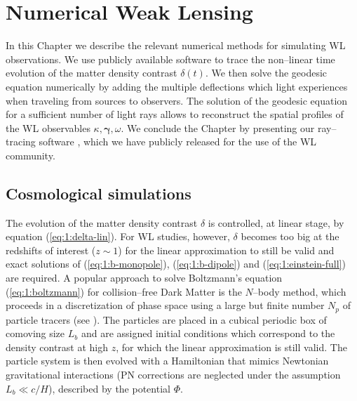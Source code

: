 
\chapter{Numerical Weak Lensing}
 \thispagestyle{plain}
\setlength{\parindent}{10mm}

\label{chp:3}
In this Chapter we describe the relevant numerical methods for simulating WL observations. We use publicly available software to trace the non--linear time evolution of the matter density contrast $\delta(t)$. We then solve the geodesic equation numerically by adding the multiple deflections which light experiences when traveling from sources to observers. The solution of the geodesic equation for a sufficient number of light rays allows to reconstruct the spatial profiles of the WL observables $\kappa,\pmb{\gamma},\omega$. We conclude the Chapter by presenting our ray--tracing software \LT, which we have publicly released for the use of the WL community.


\section{Cosmological simulations}
The evolution of the matter density contrast $\delta$ is controlled, at linear stage, by equation (\ref{eq:1:delta-lin}). For WL studies, however, $\delta$ becomes too big at the redshifts of interest ($z\sim 1$) for the linear approximation to still be valid and exact solutions of (\ref{eq:1:b-monopole}), (\ref{eq:1:b-dipole}) and (\ref{eq:1:einstein-full}) are required. A popular approach to solve Boltzmann's equation (\ref{eq:1:boltzmann}) for collision--free Dark Matter is the $N$--body method, which proceeds in a discretization of phase space using a large but finite number $N_p$ of particle tracers (see \citep{gadget2}). The particles are placed in a cubical periodic box of comoving size $L_b$ and are assigned initial conditions which correspond to the density contrast at high $z$, for which the linear approximation is still valid. The particle system is then evolved with a Hamiltonian that mimics Newtonian gravitational interactions (PN corrections are neglected under the assumption $L_b\ll c/H$), described by the potential $\Phi$.  

